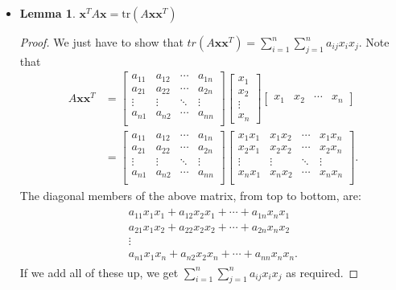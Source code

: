 \documentclass[10pt]{article}
\newtheorem{lemma}{Lemma}[section]
\newcommand{\x}{\mathbf{x}}
\newcommand{\tr}{\mathrm{tr}}
\begin{document}
\begin{itemize}
    \item \begin{lemma} \label{bilinear-as-trace}
      $\x^T A \x = \tr(A \x \x^T)$
    \end{lemma}                   
    \begin{proof}
      We just have to show that $tr(A\x\x^T) = \sum_{i=1}^n \sum_{j=1}^n a_{ij} x_i x_j$. Note that
      \begin{align*}
        A\x\x^T
        &= \begin{bmatrix}
          a_{11} & a_{12} & \cdots & a_{1n}\\
          a_{21} & a_{22} & \cdots & a_{2n}\\
          \vdots & \vdots & \ddots & \vdots\\
          a_{n1} & a_{n2} & \cdots & a_{nn}\\
        \end{bmatrix}
        \begin{bmatrix}
          x_1 \\ x_2 \\ \vdots \\ x_n
        \end{bmatrix}
        \begin{bmatrix}
          x_1 & x_2 & \cdots & x_n
        \end{bmatrix}\\
        &= \begin{bmatrix}
          a_{11} & a_{12} & \cdots & a_{1n}\\
          a_{21} & a_{22} & \cdots & a_{2n}\\
          \vdots & \vdots & \ddots & \vdots\\
          a_{n1} & a_{n2} & \cdots & a_{nn}\\
        \end{bmatrix}
        \begin{bmatrix}
          x_1 x_1 & x_1x_2 & \cdots & x_1x_n\\
          x_2 x_1 & x_2x_2 & \cdots & x_2x_n\\
          \vdots & \vdots & \ddots & \vdots\\
          x_n x_1 & x_nx_2 & \cdots & x_nx_n\\
        \end{bmatrix}.
      \end{align*}
      The diagonal members of the above matrix, from top to bottom, are:
      \begin{align*}
        \begin{matrix}
          a_{11}x_1x_1 + a_{12}x_2x_1 + \dotsb + a_{1n}x_nx_1\\
          a_{21}x_1x_2 + a_{22}x_2x_2 + \dotsb + a_{2n}x_nx_2\\
          \vdots\\
          a_{n1}x_1x_n + a_{n2}x_2x_n + \dotsb + a_{nn}x_nx_n.
        \end{matrix}
      \end{align*}
      If we add all of these up, we get $\sum_{i=1}^n \sum_{j=1}^n a_{ij}x_i x_j$ as required.
    \end{proof}  
    

\end{itemize}
\end{document}

